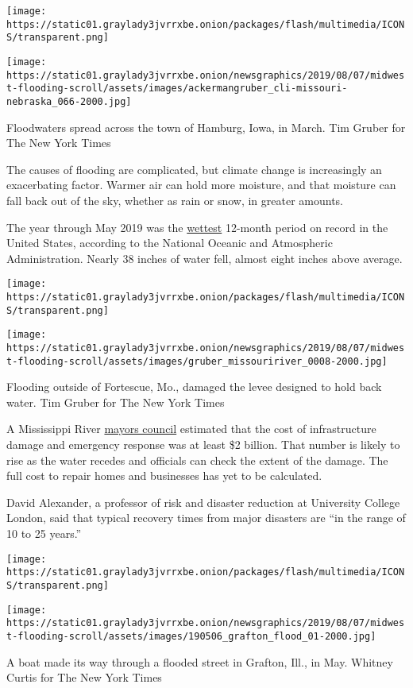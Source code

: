 \texttt{[image: https://static01.graylady3jvrrxbe.onion/packages/flash/multimedia/ICONS/transparent.png]}

\texttt{[image: https://static01.graylady3jvrrxbe.onion/newsgraphics/2019/08/07/midwest-flooding-scroll/assets/images/ackermangruber\_cli-missouri-nebraska\_066-2000.jpg]}

Floodwaters spread across the town of Hamburg, Iowa, in March. Tim
Gruber for The New York Times

The causes of flooding are complicated, but climate change is
increasingly an exacerbating factor. Warmer air can hold more moisture,
and that moisture can fall back out of the sky, whether as rain or snow,
in greater amounts.

The year through May 2019 was the
\href{https://www.noaa.gov/news/rain-soaked-us-had-its-2nd-wettest-month-on-record-in-may}{wettest}
12-month period on record in the United States, according to the
National Oceanic and Atmospheric Administration. Nearly 38 inches of
water fell, almost eight inches above average.

\texttt{[image: https://static01.graylady3jvrrxbe.onion/packages/flash/multimedia/ICONS/transparent.png]}

\texttt{[image: https://static01.graylady3jvrrxbe.onion/newsgraphics/2019/08/07/midwest-flooding-scroll/assets/images/gruber\_missouririver\_0008-2000.jpg]}

Flooding outside of Fortescue, Mo., damaged the levee designed to hold
back water. Tim Gruber for The New York Times

A Mississippi River \href{https://www.mrcti.org/}{mayors council}
estimated that the cost of infrastructure damage and emergency response
was at least \$2 billion. That number is likely to rise as the water
recedes and officials can check the extent of the damage. The full cost
to repair homes and businesses has yet to be calculated.

David Alexander, a professor of risk and disaster reduction at
University College London, said that typical recovery times from major
disasters are ``in the range of 10 to 25 years.''

\texttt{[image: https://static01.graylady3jvrrxbe.onion/packages/flash/multimedia/ICONS/transparent.png]}

\texttt{[image: https://static01.graylady3jvrrxbe.onion/newsgraphics/2019/08/07/midwest-flooding-scroll/assets/images/190506\_grafton\_flood\_01-2000.jpg]}

A boat made its way through a flooded street in Grafton, Ill., in May.
Whitney Curtis for The New York Times

